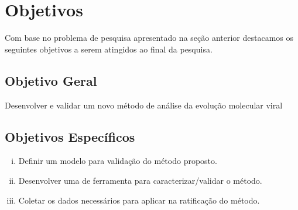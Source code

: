 \chapter{Objetivos}

Com base no problema de pesquisa apresentado na seção anterior destacamos os seguintes objetivos a serem atingidos ao final da pesquisa.
\section{Objetivo Geral}
Desenvolver e validar um novo método de análise da evolução molecular viral

\section{Objetivos Específicos}
\begin{enumerate}[(i)]
  \item Definir um modelo para validação do método proposto.
  \item Desenvolver uma de ferramenta para caracterizar/validar o método.
  \item Coletar os dados necessários para aplicar na ratificação do método.
\end{enumerate}